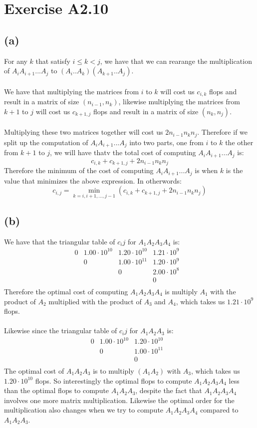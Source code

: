 \section*{Exercise A2.10}
\subsection*{(a)}
For any $k$ that satisfy $i\leq k < j$, we have that we can rearange the multiplication of $A_iA_{i+1}...A_{j}$ to $(A_i..A_k)(A_{k+1}..A_j)$.\\\\
We have that multiplying the matrices from $i$ to $k$ will cost us $c_{i,k}$ flops and result in a
matrix of size $(n_{i-1},n_k)$, likewise multiplying the matrices from $k+1$ to $j$ will cost us $c_{k+1,j}$ flops and result in a matrix of size $(n_{k},n_j)$.\\\\
Multiplying these two matrices together will cost us $2n_{i-1}n_kn_j$. Therefore if we split up the computation of 
$A_iA_{i+1}...A_{j}$ into two parts, one from $i$ to $k$ the other from $k+1$ to $j$, we will have thatv the total cost of computing $A_iA_{i+1}...A_{j}$ is:
$$c_{i,k}+c_{k+1,j}+2n_{i-1}n_kn_j$$
Therefore the minimum of the cost of computing $A_iA_{i+1}...A_{j}$ is when $k$ is the value that minimizes the above expression. In otherwords:
$$c_{i,j}=\min_{k=i,i+1,...,j-1}(c_{i,k}+c_{k+1,j}+2n_{i-1}n_kn_j)$$
\subsection*{(b)}
We have that the triangular table of $c_ij$ for $A_1A_2A_3A_4$ is:
$$\begin{matrix}
    0&1.00\cdot 10^{10}&1.20\cdot 10^{10}&1.21\cdot 10^{9}&\\
    & 0&1.00\cdot 10^{11}&1.20\cdot 10^{9}&\\
    & & 0&2.00\cdot 10^{8}&\\
    & & & 0&\\
    \end{matrix}$$
Therefore the optimal cost of computing $A_1A_2A_3A_4$ 
is multiply $A_1$ with the product of $A_2$ multiplied with the product of $A_3$ and $A_4$, 
which takes us $\boxed{1.21\cdot 10^9}$ flops.
\\\\
Likewise since the triangular table of $c_ij$ for $A_1A_2A_3$ is:
$$\begin{matrix}
    0&1.00\cdot 10^{10}&1.20\cdot 10^{10}&\\
    & 0&1.00\cdot 10^{11}&\\
    & & 0&\\
    \end{matrix}$$
The optimal cost of $A_1A_2A_3$ is to multiply $(A_1A_2)$ with $A_3$, 
which takes us $1.20\cdot 10^{10}$ flops. So interestingly the optimal flops
to compute $A_1A_2A_3A_4$ less than the optimal flops to compute $A_1A_2A_3$, 
despite the fact that $A_1A_2A_3A_4$ involves one more matrix multiplication. Likewise the
optimal order for the multiplication also changes when we try to compute $A_1A_2A_3A_4$ compared to $A_1A_2A_3$.





